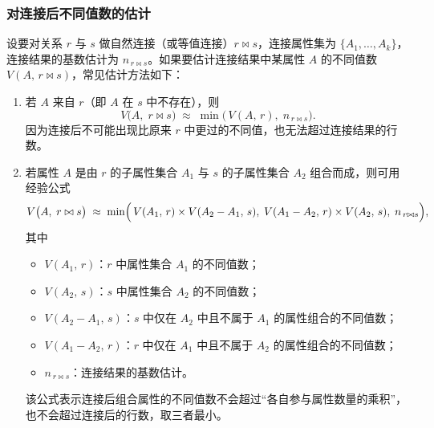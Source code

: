 \subsubsection{对连接后不同值数的估计}
设要对关系 $r$ 与 $s$ 做自然连接（或等值连接）$r \bowtie s$，连接属性集为 $\{A_1,\dots,A_k\}$，连接结果的基数估计为 $n_{\,r\bowtie s}$。如果要估计连接结果中某属性 $A$ 的不同值数 $V(A,\,r\bowtie s)$，常见估计方法如下：
\begin{enumerate}
  \item 若 $A$ 来自 $r$（即 $A$ 在 $s$ 中不存在），则
    \[
    V\bigl(A,\;r \bowtie s\bigr)
    \;\approx\;
    \min\bigl(\,V(A,\,r),\;n_{\,r\bowtie s}\bigr).
    \]
    因为连接后不可能出现比原来 $r$ 中更过的不同值，也无法超过连接结果的行数。
  \item 若属性 $A$ 是由 $r$ 的子属性集合 $A_1$ 与 $s$ 的子属性集合 $A_2$ 组合而成，则可用经验公式
    \[
    V\bigl(A,\;r \bowtie s\bigr)
    \;\approx\;
    \min\Bigl(\,
      V(A_1,\,r)\times V(A_2 - A_1,\,s),\;
      V(A_1 - A_2,\,r)\times V(A_2,\,s),\;
      n_{\,r\bowtie s}
    \Bigr),
    \]
    其中
    \begin{itemize}
      \item $V(A_1,\,r)$：$r$ 中属性集合 $A_1$ 的不同值数；
      \item $V(A_2,\,s)$：$s$ 中属性集合 $A_2$ 的不同值数；
      \item $V(A_2 - A_1,\,s)$：$s$ 中仅在 $A_2$ 中且不属于 $A_1$ 的属性组合的不同值数；
      \item $V(A_1 - A_2,\,r)$：$r$ 中仅在 $A_1$ 中且不属于 $A_2$ 的属性组合的不同值数；
      \item $n_{\,r\bowtie s}$：连接结果的基数估计。
    \end{itemize}
    该公式表示连接后组合属性的不同值数不会超过“各自参与属性数量的乘积”，也不会超过连接后的行数，取三者最小。
\end{enumerate}

